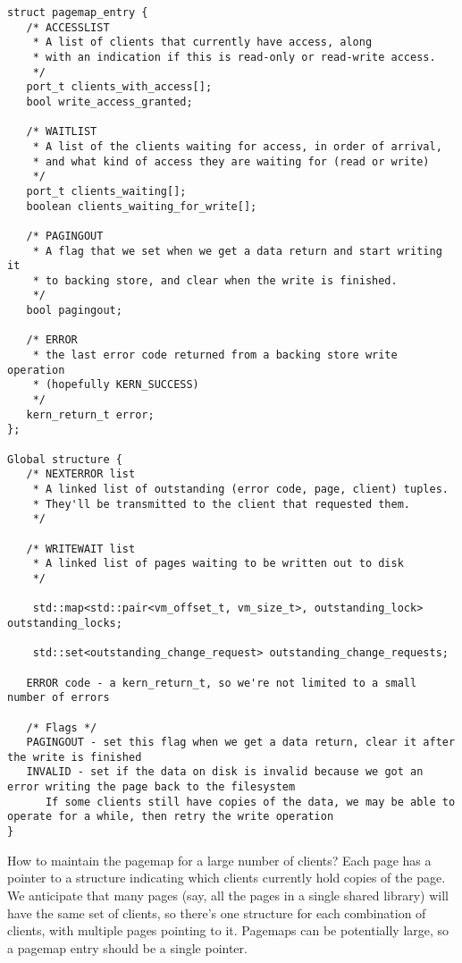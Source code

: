 \documentclass{article}
\begin{document}
\begin{verbatim}
struct pagemap_entry {
   /* ACCESSLIST
    * A list of clients that currently have access, along
    * with an indication if this is read-only or read-write access.
    */
   port_t clients_with_access[];
   bool write_access_granted;

   /* WAITLIST
    * A list of the clients waiting for access, in order of arrival,
    * and what kind of access they are waiting for (read or write)
    */
   port_t clients_waiting[];
   boolean clients_waiting_for_write[];

   /* PAGINGOUT
    * A flag that we set when we get a data return and start writing it
    * to backing store, and clear when the write is finished.
    */
   bool pagingout;

   /* ERROR
    * the last error code returned from a backing store write operation
    * (hopefully KERN_SUCCESS)
    */
   kern_return_t error;
};

Global structure {
   /* NEXTERROR list
    * A linked list of outstanding (error code, page, client) tuples.
    * They'll be transmitted to the client that requested them.
    */

   /* WRITEWAIT list
    * A linked list of pages waiting to be written out to disk
    */

    std::map<std::pair<vm_offset_t, vm_size_t>, outstanding_lock> outstanding_locks;

    std::set<outstanding_change_request> outstanding_change_requests;

   ERROR code - a kern_return_t, so we're not limited to a small number of errors

   /* Flags */
   PAGINGOUT - set this flag when we get a data return, clear it after the write is finished
   INVALID - set if the data on disk is invalid because we got an error writing the page back to the filesystem
      If some clients still have copies of the data, we may be able to operate for a while, then retry the write operation
}
\end{verbatim}

How to maintain the pagemap for a large number of clients?  Each page
has a pointer to a structure indicating which clients currently hold
copies of the page.  We anticipate that many pages (say, all the pages
in a single shared library) will have the same set of clients, so
there's one structure for each combination of clients, with multiple
pages pointing to it.  Pagemaps can be potentially large, so a pagemap
entry should be a single pointer.
\end{document}
